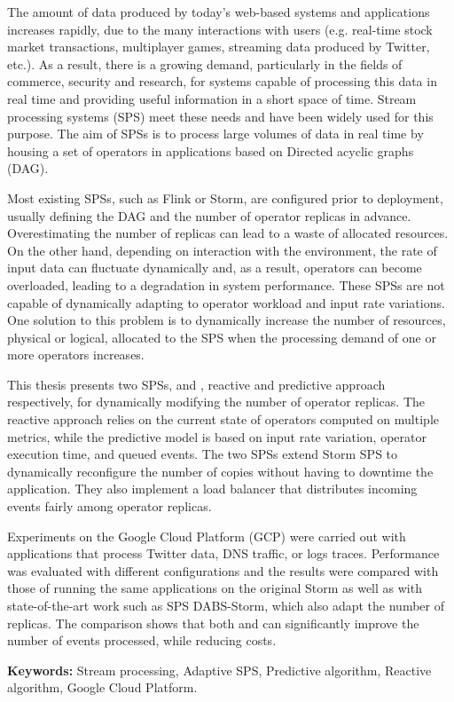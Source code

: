 %
\label{abstract}

The amount of data produced by today's web-based systems and applications increases rapidly, due to the many interactions with users (e.g. real-time stock market transactions, multiplayer games, streaming data produced by Twitter, etc.). As a result, there is a growing demand, particularly in the fields of commerce, security and research, for systems capable of processing this data in real time and providing useful information in a short space of time. Stream processing systems (SPS) meet these needs and have been widely used for this purpose. The aim of SPSs is to process large volumes of data in real time by housing a set of operators in applications based on Directed acyclic graphs (DAG).

Most existing SPSs, such as Flink or Storm, are configured prior to deployment, usually defining the DAG and the number of operator replicas in advance. Overestimating the number of replicas can lead to a waste of allocated resources. On the other hand, depending on interaction with the environment, the rate of input data can fluctuate dynamically and, as a result, operators can become overloaded, leading to a degradation in system performance. These SPSs are not capable of dynamically adapting to operator workload and input rate variations.
One solution to this problem is to dynamically increase the number of resources, physical or logical, allocated to the SPS when the processing demand of one or more operators increases.

This thesis presents two SPSs, \rSPS{} and \pSPS{}, reactive and predictive approach respectively, for dynamically modifying the number of operator replicas. The reactive approach relies on the current state of operators computed on multiple metrics, while the predictive model is based on input rate variation, operator execution time, and queued events. 
The two SPSs extend Storm SPS to dynamically reconfigure the number of copies without having to downtime the application. They also implement a load balancer that distributes incoming events fairly among operator replicas.

Experiments on the Google Cloud Platform (GCP) were carried out with applications that process Twitter data, DNS traffic, or logs traces. Performance was evaluated with different configurations and the results were compared with those of running the same applications on the original Storm as well as with state-of-the-art work such as SPS DABS-Storm, which also adapt the number of replicas. The comparison shows that both \rSPS{} and \pSPS{} can significantly improve the number of events processed, while reducing costs.

\textbf{Keywords:} 
Stream processing, Adaptive SPS, Predictive algorithm, Reactive algorithm, Google Cloud Platform.